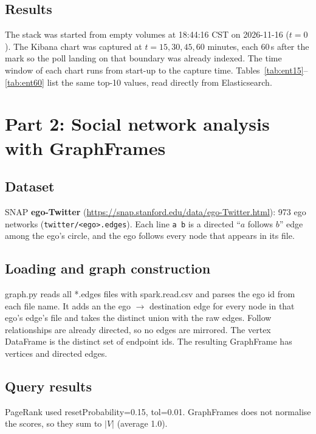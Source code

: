\documentclass[11pt]{article}
\begin{document}
\subsection{Results}
The stack was started from empty volumes at 18:44:16 CST on 2026-11-16
($t=0$). The Kibana chart was captured at $t = 15, 30, 45, 60$ minutes, each
60\,s after the mark so the poll landing on that boundary was already indexed.
The time window of each chart runs from start-up to the capture time.
Tables~\ref{tab:ent15}--\ref{tab:ent60} list the same top-10 values, read
directly from Elasticsearch.



\section{Part 2: Social network analysis with GraphFrames}

\subsection{Dataset}
SNAP \textbf{ego-Twitter}
(\url{https://snap.stanford.edu/data/ego-Twitter.html}):
973 ego networks (\texttt{twitter/<ego>.edges}). Each line \texttt{a
b} is a directed
``$a$ follows $b$'' edge among the ego's circle, and the ego follows
every node that
appears in its file.

\subsection{Loading and graph construction}
graph.py reads all *.edges files with spark.read.csv and parses the
ego id from each file name. It adds
an the ego $\rightarrow$ destination edge for every node in that ego's
edge's file and takes the distinct union with the raw edges. Follow
relationships are already directed, so no edges are mirrored. The
vertex DataFrame is the distinct set of endpoint ids. The resulting
GraphFrame has \nVertices{} vertices and \nEdges{}
directed edges.

\subsection{Query results}
PageRank used resetProbability=0.15, tol=0.01. GraphFrames
does not normalise the scores, so they sum to $|V|$ (average 1.0).
\end{document}
